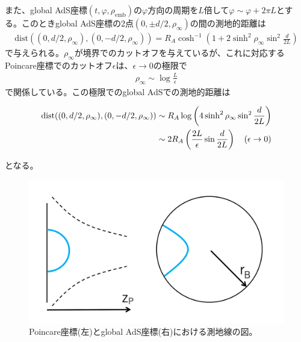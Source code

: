 また、global AdS座標$(t,\varphi,\rho_\text{emb})$の$\varphi$方向の周期を$L$倍して$\varphi\sim \varphi+2\pi L$とする。このときglobal AdS座標の2点$(0,\pm d/2,\rho_\infty)$の間の測地的距離は
\begin{align}
\text{dist}((0,d/2,\rho_\infty),(0,-d/2,\rho_\infty))=R_A \cosh^{-1}\left( 1+2\sinh^2\rho_\infty \sin^2\frac{d}{2L} \right)
\end{align}
で与えられる。$\rho_\infty$が境界でのカットオフを与えているが、これに対応するPoincare座標でのカットオフ$\epsilon$は、$\epsilon \to 0$の極限で
\begin{align}
\rho_\infty \sim \log \frac{L}{\epsilon}
\end{align}
で関係している。この極限でのglobal AdSでの測地的距離は
\begin{oframed}
\begin{align}\label{geodlengthGlobal}
\text{dist}((0,d/2,\rho_\infty),(0,-d/2,\rho_\infty))&\sim R_A \log\left( 4\sinh^2 \rho_\infty \sin^2\frac{d}{2L} \right)\notag\\
&\sim 2R_A\left(\frac{2L}{\epsilon}\sin\frac{d}{2L}\right) \quad (\epsilon\to 0)
\end{align}
\end{oframed}
となる。
\begin{figure}[h]
	\centering
	\includegraphics[width=0.7\linewidth]{adsgeod.pdf}
	\caption{Poincare座標(左)とglobal AdS座標(右)における測地線の図。}
	\label{fig:adsgeod}
\end{figure}

